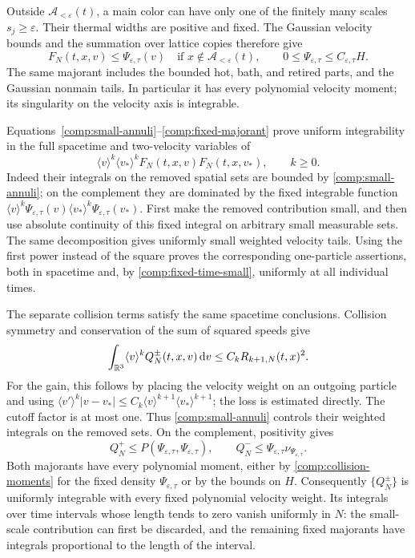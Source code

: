 Outside $\mathcal A_{<\varepsilon}(t)$, a main color can have only
one of the finitely many scales $s_j\ge\varepsilon$.
Their thermal widths are positive and fixed. The Gaussian velocity
bounds and the summation over lattice copies therefore give
\begin{equation}\label{comp:fixed-majorant}
 F_N(t,x,v)\le \Psi_{\varepsilon,\tau}(v)
 \quad\text{if }x\notin\mathcal A_{<\varepsilon}(t),
 \qquad
 0\le\Psi_{\varepsilon,\tau}\le C_{\varepsilon,\tau}H.
\end{equation}
The same majorant includes the bounded hot, bath, and retired parts,
and the Gaussian nonmain tails. In particular it has every polynomial
velocity moment; its singularity on the velocity axis is integrable.

Equations~\eqref{comp:small-annuli}--\eqref{comp:fixed-majorant}
prove uniform integrability in the full spacetime and two-velocity
variables of
\begin{equation}\label{comp:weighted-pairs}
 \langle v\rangle^k\langle v_*\rangle^k
 F_N(t,x,v)F_N(t,x,v_*),\qquad k\ge0.
\end{equation}
Indeed their integrals on the removed spatial sets are bounded by
\eqref{comp:small-annuli}; on the complement they are dominated by the
fixed integrable function
$\langle v\rangle^k\Psi_{\varepsilon,\tau}(v)
 \langle v_*\rangle^k\Psi_{\varepsilon,\tau}(v_*)$.
First make the removed contribution small, and then use absolute
continuity of this fixed integral on arbitrary small measurable sets.
The same decomposition gives uniformly small weighted velocity tails.
Using the first power instead of the square proves the corresponding
one-particle assertions, both in spacetime and, by
\eqref{comp:fixed-time-small}, uniformly at all individual times.

The separate collision terms satisfy the same spacetime conclusions.
Collision symmetry and conservation of the sum of squared speeds give
\begin{equation}\label{comp:collision-moments}
 \int_{\mathbb R^3}\langle v\rangle^kQ_N^\pm(t,x,v)\,\mathrm d v
 \le C_k R_{k+1,N}(t,x)^2.
\end{equation}
For the gain, this follows by placing the velocity weight on an
outgoing particle and using
$\langle v'\rangle^k|v-v_*|
 \le C_k\langle v\rangle^{k+1}\langle v_*\rangle^{k+1}$;
the loss is estimated directly. The cutoff factor is at most one.
Thus \eqref{comp:small-annuli} controls their weighted integrals on the
removed sets. On the complement, positivity gives
\[
 Q_N^+\le P(\Psi_{\varepsilon,\tau},\Psi_{\varepsilon,\tau}),
 \qquad
 Q_N^-\le\Psi_{\varepsilon,\tau}\nu_{\Psi_{\varepsilon,\tau}}.
\]
Both majorants have every polynomial moment, either by
\eqref{comp:collision-moments} for the fixed density
$\Psi_{\varepsilon,\tau}$ or by the bounds on $H$.
Consequently $\{Q_N^\pm\}$ is uniformly integrable with every fixed
polynomial velocity weight. Its integrals over time intervals whose
length tends to zero vanish uniformly in $N$: the small-scale
contribution can first be discarded, and the remaining fixed
majorants have integrals proportional to the length of the interval.

